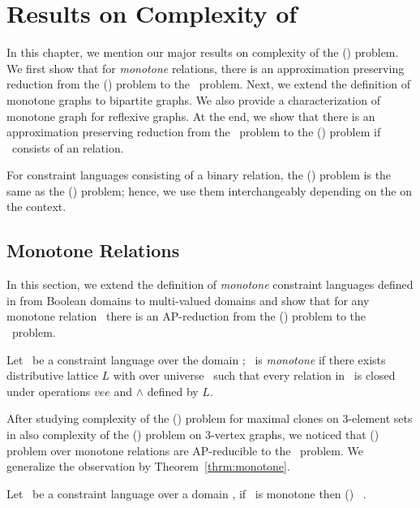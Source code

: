\chapter{Results on Complexity of \cbis} \label{chp:results}
In this chapter, we mention our major results on complexity 
of the \ccsp(\mrelset) problem. We first show that for \emph{monotone} relations, there is an
approximation preserving reduction from the \ccsp(\mrelset) problem to the \cbis\ problem.
Next, we extend the definition of monotone graphs to bipartite graphs. We also provide a characterization of monotone graph for reflexive graphs.
At the end, we show that there is an approximation preserving reduction from the \cbis\ problem 
to the \ccsp(\mrelset) problem if \mrelset\ consists of an \emph{\RBA} relation.

For constraint languages consisting of a binary relation, the \ccsp(\mrelset) problem is
the same as the \chom(\mH) problem; hence, we use them interchangeably depending on the on the context.

\section{Monotone Relations}
In this section, we extend the definition of \emph{monotone} constraint languages defined in
\cite{Trichotomy} from Boolean domains to multi-valued domains and show that for
any monotone relation \mrelset\ there is an AP-reduction from the \ccsp(\mrelset) problem to
the \cbis\ problem.

\begin{defi}
Let \mrelset\ be a constraint language over the domain \mD; \mrelset\ is \emph{monotone}
if there exists distributive lattice \(L\) with over universe \mD\ such that every relation 
in \mrelset\ is closed under operations \(vee\) and \(\wedge\) defined by \(L\)\@.
\end{defi}

After studying complexity of the \ccsp(\mrelset) problem for maximal clones on 3-element sets
in \cite{mvl} also complexity of the \chom(\mH) problem on 3-vertex graphs,
we noticed that \ccsp(\mrelset) problem over 
monotone relations are AP-reducible to the \cdsp\ problem. We generalize the observation by
Theorem~\ref{thrm:monotone}\@.

\begin{theorem} \label{thrm:monotone}
Let \mrelset\ be a constraint language over a domain \mD, if 
\mrelset\ is monotone then \ccsp(\mrelset) \maple\ \cbis\@.
\end{theorem}


